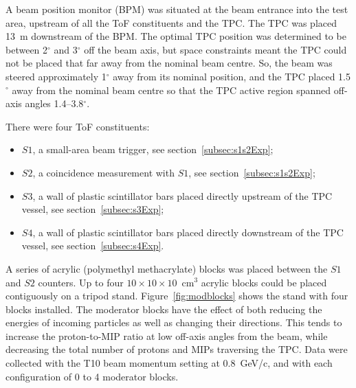 A beam position monitor (BPM) was situated at the beam entrance into the test area, upstream of all the ToF constituents and the TPC. 
The TPC was placed 13~m downstream of the BPM. The optimal TPC position was determined to be between 2$^{ \circ }$ and 3$^{ \circ }$ off the beam axis, but space constraints meant the TPC could not be placed that far away from the nominal beam centre. So, the beam was steered approximately 1$^{ \circ }$ away from its nominal position, and the TPC placed 1.5$^{ \circ }$ away from the nominal beam centre so that the TPC active region spanned off-axis angles 1.4--3.8$^{ \circ }$.

There were four ToF constituents: 
\begin{itemize}
    \item $\mathit{S1}$, a small-area beam trigger, see section~\ref{subsec:s1s2Exp};
    \item $\mathit{S2}$, a coincidence measurement with $\mathit{S1}$, see section~\ref{subsec:s1s2Exp};
    \item $\mathit{S3}$, a wall of plastic scintillator bars placed directly upstream of the TPC vessel, see section~\ref{subsec:s3Exp};
    \item $\mathit{S4}$, a wall of plastic scintillator bars placed directly downstream of the TPC vessel, see section~\ref{subsec:s4Exp}.
\end{itemize}

A series of acrylic (polymethyl methacrylate) blocks was placed between the $\mathit{S1}$ and $\mathit{S2}$ counters.
Up to four $10\times10\times10$~cm$^3$ acrylic blocks could be placed contiguously on a tripod stand.
Figure~\ref{fig:modblocks} shows the stand with four blocks installed.
The moderator blocks have the effect of both reducing the energies of incoming particles as well as changing their directions.
This tends to increase the proton-to-MIP ratio at low off-axis angles from the beam, while decreasing the total number of protons and MIPs traversing the TPC.
Data were collected with the T10 beam momentum setting at 0.8~GeV/c, and with each configuration of 0 to 4 moderator blocks.

